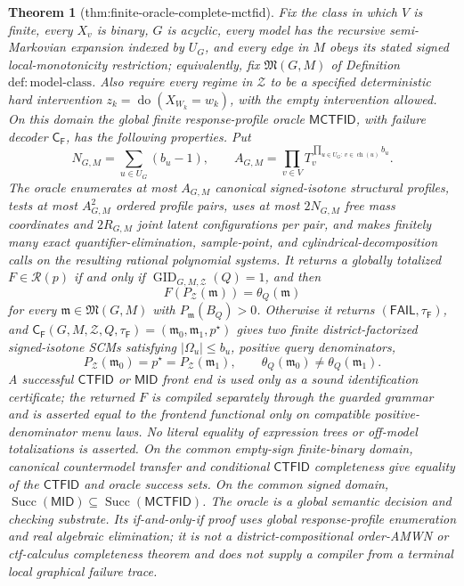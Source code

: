 \documentclass{article}
\newtheorem{theorem}{Theorem}
\begin{document}
\begin{theorem}[thm:finite-oracle-complete-mctfid]\label{thm:finite-oracle-complete-mctfid}
Fix the class in which \(V\) is finite, every \(X_v\) is binary, \(G\) is acyclic, every model has the recursive semi-Markovian expansion indexed by \(U_G\), and every edge in \(M\) obeys its stated signed local-monotonicity restriction; equivalently, fix \(\mathfrak M(G,M)\) of Definition \(\mathrm{def:model\text{-}class}\).  Also require every regime in \(\mathcal Z\) to be a specified deterministic hard intervention \(z_k=\operatorname{do}(X_{W_k}=w_k)\), with the empty intervention allowed.  On this domain the global finite response-profile oracle \(\mathsf{MCTFID}\), with failure decoder \(\mathsf C_{\mathsf F}\), has the following properties.  Put
\[
 N_{G,M}=\sum_{u\in U_G}(b_u-1),
 \qquad
 A_{G,M}=\prod_{v\in V}T_v^{\prod_{u\in U_G:\,v\in\operatorname{ch}(u)}b_u}.
\]
The oracle enumerates at most \(A_{G,M}\) canonical signed-isotone structural profiles, tests at most \(A_{G,M}^2\) ordered profile pairs, uses at most \(2N_{G,M}\) free mass coordinates and \(2R_{G,M}\) joint latent configurations per pair, and makes finitely many exact quantifier-elimination, sample-point, and cylindrical-decomposition calls on the resulting rational polynomial systems.  It returns a globally totalized \(F\in\mathcal R(p)\) if and only if \(\operatorname{GID}_{G,M,\mathcal Z}(Q)=1\), and then
\[
 F(P_{\mathcal Z}(\mathfrak m))=\theta_Q(\mathfrak m)
\]
for every \(\mathfrak m\in\mathfrak M(G,M)\) with \(P_{\mathfrak m}(B_Q)>0\).  Otherwise it returns \((\mathsf{FAIL},\tau_{\mathsf F})\), and \(\mathsf C_{\mathsf F}(G,M,\mathcal Z,Q,\tau_{\mathsf F})=(\mathfrak m_0,\mathfrak m_1,p^{\star})\) gives two finite district-factorized signed-isotone SCMs satisfying \(|\Omega_u|\le b_u\), positive query denominators,
\[
 P_{\mathcal Z}(\mathfrak m_0)=p^{\star}=P_{\mathcal Z}(\mathfrak m_1),
 \qquad
 \theta_Q(\mathfrak m_0)\ne\theta_Q(\mathfrak m_1).
\]
A successful \(\mathsf{CTFID}\) or \(\mathsf{MID}\) front end is used only as a sound identification certificate; the returned \(F\) is compiled separately through the guarded grammar and is asserted equal to the frontend functional only on compatible positive-denominator menu laws.  No literal equality of expression trees or off-model totalizations is asserted.  On the common empty-sign finite-binary domain, canonical countermodel transfer and conditional \(\mathsf{CTFID}\) completeness give equality of the \(\mathsf{CTFID}\) and oracle success sets.  On the common signed domain, \(\operatorname{Succ}(\mathsf{MID})\subseteq\operatorname{Succ}(\mathsf{MCTFID})\).  The oracle is a global semantic decision and checking substrate.  Its if-and-only-if proof uses global response-profile enumeration and real algebraic elimination; it is not a district-compositional order-AMWN or ctf-calculus completeness theorem and does not supply a compiler from a terminal local graphical failure trace.
\end{theorem}
\end{document}
